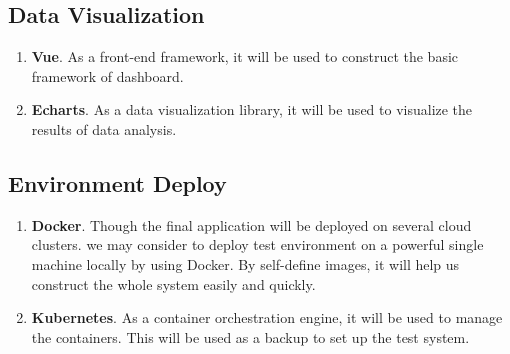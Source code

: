 \subsection{Data Visualization}

\begin{enumerate}
    \item \textbf{Vue}. As a front-end framework, it will be used to construct the basic framework of dashboard.
    \item \textbf{Echarts}. As a data visualization library, it will be used to visualize the results of data analysis.
\end{enumerate}

\subsection{Environment Deploy}

\begin{enumerate}
    \item \textbf{Docker}. Though the final application will be deployed on several cloud clusters. we may consider to deploy test environment on a powerful single machine locally by using Docker. By self-define images, it will help us construct the whole system easily and quickly.
    \item \textbf{Kubernetes}. As a container orchestration engine, it will be used to manage the containers. This will be used as a backup to set up the test system.
\end{enumerate}
